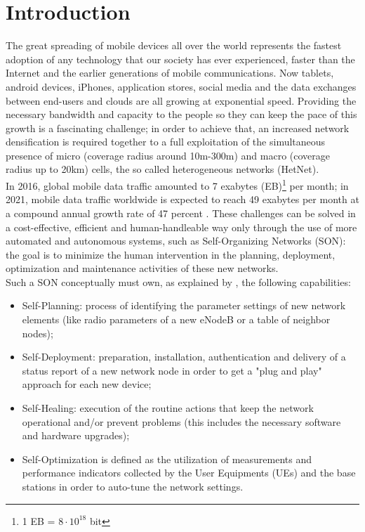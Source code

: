 \documentclass[conference,10pt]{IEEEtran}
\begin{document}
\section{Introduction}\label{sec:intro}
The great spreading of mobile devices all over the world represents the fastest adoption of any technology that
our society has ever experienced, faster than the Internet and the earlier generations of mobile
communications. Now tablets, android devices, iPhones, application stores, social media and the data
exchanges between end-users and clouds are all growing at exponential speed. Providing the necessary bandwidth and capacity to the people so they can keep the pace of this growth is a fascinating challenge; in order to achieve that, an increased network densification is required together to a full exploitation of the simultaneous presence of micro (coverage radius around 10m-300m) and macro (coverage radius up to 20km) cells, the so called heterogeneous networks (HetNet).\\
In 2016, global mobile data traffic amounted to 7 exabytes (EB)\footnote{1 EB = $8\cdot 10^{18}$ bit} per month; in 2021, mobile data traffic worldwide is expected to reach 49 exabytes per month at a compound annual growth rate of 47 percent \cite{indexglobal}.
These challenges can be solved in a cost-effective, efficient and human-handleable way only through the use of more automated and autonomous systems, such as Self-Organizing Networks (SON): the goal is to minimize the human intervention in the planning, deployment, optimization and maintenance activities of these new networks.\\
Such a SON conceptually must own, as explained by \cite{ramiro2011self}, the following capabilities:
\begin{itemize}
\item Self-Planning: process of identifying the parameter settings of new network elements (like radio parameters of a new eNodeB or a table of neighbor nodes);
\item Self-Deployment: preparation, installation, authentication and delivery of a status report of
a new network node in order to get a "plug and play" approach for each new device;
\item Self-Healing: execution of the routine actions that keep the network operational and/or
prevent problems (this includes the necessary software and hardware upgrades);
\item Self-Optimization is defined as the utilization of measurements and performance indicators
collected by the User Equipments (UEs) and the base stations in order to auto-tune the network
settings.
\end{itemize}
\end{document}
